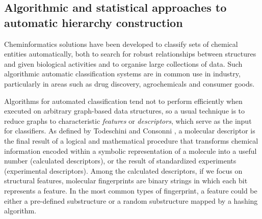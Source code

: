 \documentclass[10pt]{bmc_article}
\newenvironment{bmcformat}{\baselineskip20pt\sloppy\setboolean{publ}{false}}{\baselineskip20pt\sloppy}
\begin{document}
\begin{bmcformat}
\subsection*{Algorithmic and statistical approaches to automatic hierarchy construction}
\label{sec:resultscheminf}


Cheminformatics solutions have been developed to classify sets of chemical entities automatically, both to search for robust relationships between structures and given biological activities and to organise large collections of data. Such algorithmic automatic classification systems are in common use in industry, particularly in areas such as drug discovery, agrochemicals and consumer goods.  

Algorithms for automated classification tend not to perform efficiently when executed on arbitrary graph-based data structures, so a usual technique is to reduce graphs to characteristic \textit{features} or \textit{descriptors}, which serve as the input for classifiers. As defined by Todeschini and Consonni \cite{Todeschini2000}, a molecular descriptor is the final result of a logical and mathematical procedure that transforms chemical information encoded within a symbolic representation of a molecule into a useful number (calculated descriptors), or the result of standardized experiments (experimental descriptors). Among the calculated descriptors, if we focus on structural features, molecular fingerprints are binary strings in which each bit represents a feature.  In the most common types of fingerprint, a feature could be either a pre-defined substructure or a random substructure mapped by a hashing algorithm.


\end{bmcformat}
\end{document}
